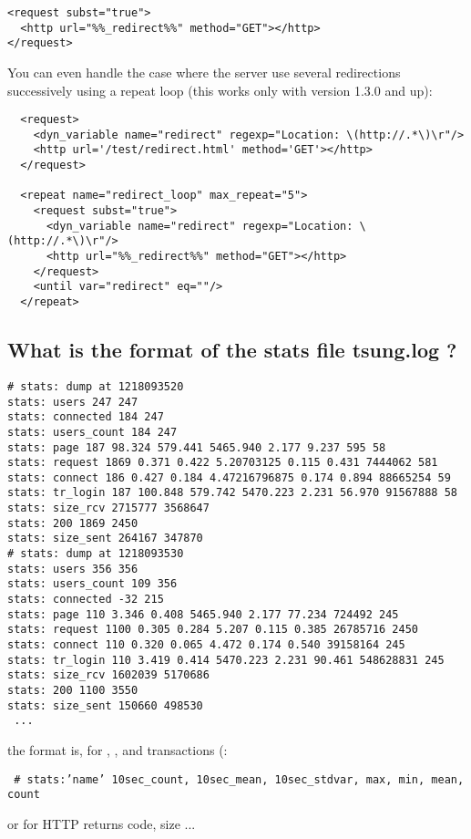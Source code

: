 \documentclass{IDXDOC-en}
\begin{document}
\begin{appendix}
\begin{Verbatim}
<request subst="true">
  <http url="%%_redirect%%" method="GET"></http>
</request>
\end{Verbatim}

You can even handle the case where the server use several redirections
successively using a repeat loop (this works only with version 1.3.0 and up):

\begin{Verbatim}
  <request>
    <dyn_variable name="redirect" regexp="Location: \(http://.*\)\r"/>
    <http url='/test/redirect.html' method='GET'></http>
  </request>

  <repeat name="redirect_loop" max_repeat="5">
    <request subst="true">
      <dyn_variable name="redirect" regexp="Location: \(http://.*\)\r"/>
      <http url="%%_redirect%%" method="GET"></http>
    </request>
    <until var="redirect" eq=""/>
  </repeat>
\end{Verbatim}

\subsection{What is the format of the stats file tsung.log ?}

\begin{Verbatim}
# stats: dump at 1218093520
stats: users 247 247
stats: connected 184 247
stats: users_count 184 247
stats: page 187 98.324 579.441 5465.940 2.177 9.237 595 58
stats: request 1869 0.371 0.422 5.20703125 0.115 0.431 7444062 581
stats: connect 186 0.427 0.184 4.47216796875 0.174 0.894 88665254 59
stats: tr_login 187 100.848 579.742 5470.223 2.231 56.970 91567888 58
stats: size_rcv 2715777 3568647
stats: 200 1869 2450
stats: size_sent 264167 347870
# stats: dump at 1218093530
stats: users 356 356
stats: users_count 109 356
stats: connected -32 215
stats: page 110 3.346 0.408 5465.940 2.177 77.234 724492 245
stats: request 1100 0.305 0.284 5.207 0.115 0.385 26785716 2450
stats: connect 110 0.320 0.065 4.472 0.174 0.540 39158164 245
stats: tr_login 110 3.419 0.414 5470.223 2.231 90.461 548628831 245
stats: size_rcv 1602039 5170686
stats: 200 1100 3550
stats: size_sent 150660 498530
 ...
\end{Verbatim}

 the format is, for , ,
  and transactions (:

 \texttt{ \# stats:'name' 10sec\_count, 10sec\_mean, 10sec\_stdvar,
   max, min, mean, count}

 or for HTTP returns code, size ...


\end{appendix}
\end{document}
